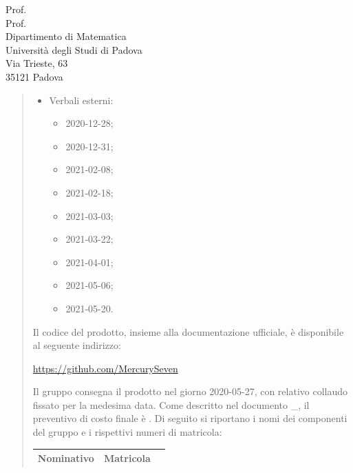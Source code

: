 \documentclass[a4paper,12pt]{letteracdp}
\begin{document}
\begin{letter}{
	Prof. \Tullio{} \\
	Prof. \Riccardo{} \\
	Dipartimento di Matematica \\
	Università degli Studi di Padova \\
	Via Trieste, 63 \\
	35121 Padova}
\begin{quotation}
\begin{itemize}
\begin{itemize}
			\item \docVI{}2021-02-01;
			\item \docVI{}2021-02-20;
			\item \docVI{}2021-03-18;
			\item \docVI{}2021-03-28;
			\item \docVI{}2021-04-16;
			\item \docVI{}2021-05-04;
			\item \docVI{}2021-05-21.
		\end{itemize}
		\item Verbali esterni:
		\begin{itemize}
			\item \docVE{}2020-12-28;
			\item \docVE{}2020-12-31;
			\item \docVE{}2021-02-08;
			\item \docVE{}2021-02-18;
			\item \docVE{}2021-03-03;
			\item \docVE{}2021-03-22;
			\item \docVE{}2021-04-01;
			\item \docVE{}2021-05-06;
			\item \docVE{}2021-05-20.
		\end{itemize}
\thispagestyle{empty}		
	\end{itemize}
Il codice del prodotto, insieme alla documentazione ufficiale, è disponibile al seguente indirizzo:\newline{}
\centerline{\url{https://github.com/MercurySeven}}\newline{}
Il gruppo consegna il prodotto nel giorno 2020-05-27, con relativo collaudo fissato per la medesima data.\newline{}
Come descritto nel documento \docPdP{}\_\versPdP{}, il preventivo di costo finale è \textbf{}. \newline{}
Di seguito si riportano i nomi dei componenti del gruppo e i rispettivi numeri di matricola:
	
	
\renewcommand{\arraystretch}{1}
	\begin{table}
		\begin{center}
			\setlength{\aboverulesep}{0pt}
			\setlength{\belowrulesep}{0pt}
			\setlength{\extrarowheight}{.75ex}
			\begin{tabular}{ c c c }
				\rowcolor{AzzurroGruppo!30} 
				\textbf{Nominativo} & \textbf{Matricola}\\
				\toprule
				

\end{tabular}
\end{center}
\end{table}
\end{quotation}
\end{letter}
\end{document}
